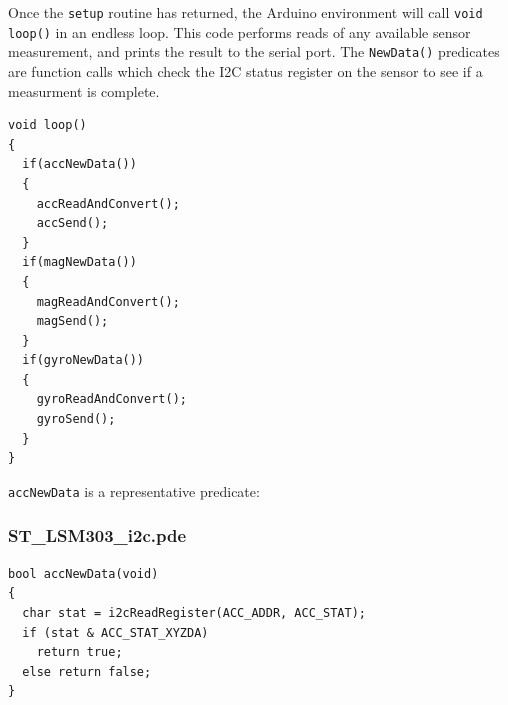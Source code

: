 \documentclass[12pt]{report}
\begin{document}
Once the \lstinline$setup$ routine has returned, the Arduino environment will call \lstinline$void loop()$ in an endless loop. This code performs reads of any available sensor measurement, and prints the result to the serial port. The \lstinline$NewData()$ predicates are function calls which check the I2C status register on the sensor to see if a measurment is complete.

\begin{lstlisting}
void loop()
{
  if(accNewData())
  {
    accReadAndConvert();
    accSend();
  }
  if(magNewData())
  {
    magReadAndConvert();  
    magSend();
  }  
  if(gyroNewData())
  {
    gyroReadAndConvert();
    gyroSend();
  }
}
\end{lstlisting}

\lstinline$accNewData$ is a representative predicate:
\subsubsection{ST\_LSM303\_i2c.pde}
\begin{lstlisting}
bool accNewData(void)
{
  char stat = i2cReadRegister(ACC_ADDR, ACC_STAT);
  if (stat & ACC_STAT_XYZDA)
    return true;
  else return false;
}
\end{lstlisting}
\end{document}
